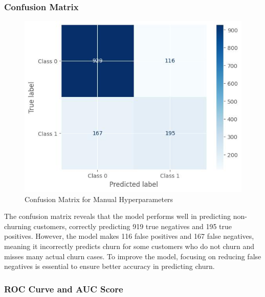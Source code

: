 \subsubsection{Confusion Matrix}

\begin{figure}[hbt!]
    \centering
    \includegraphics[width=1\linewidth]{Images/5.5.3.a.jpg}
    \caption{Confusion Matrix for Manual Hyperparameters}
    \label{fig:enter-label}
\end{figure}

The confusion matrix reveals that the model performs well in predicting non-churning customers, correctly predicting 919 true negatives and 195 true positives. However, the model makes 116 false positives and 167 false negatives, meaning it incorrectly predicts churn for some customers who do not churn and misses many actual churn cases. To improve the model, focusing on reducing false negatives is essential to ensure better accuracy in predicting churn.

\subsubsection{ROC Curve and AUC Score}

